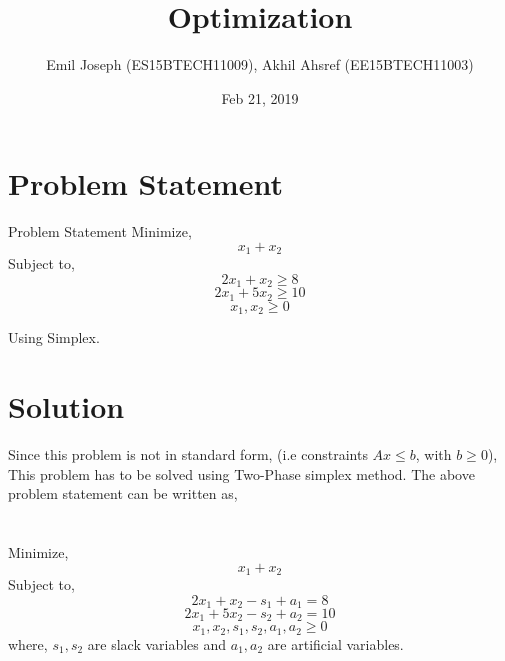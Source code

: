 \documentclass{beamer}
\title[Your Short Title]{Optimization}
\author{Emil Joseph (ES15BTECH11009), Akhil Ahsref (EE15BTECH11003)}
\institute{IITH}
\date{Feb 21, 2019}
\begin{document}
\begin{frame}
  \titlepage
\end{frame}


\section{Problem Statement}

\begin{frame}{Problem Statement}
Minimize, \\
$$x_{1} + x_{2}$$
Subject to,
\begin{equation*}
    2x_{1} + x_{2} \geq 8 
\end{equation*}
\begin{equation*}
    2x_{1} + 5x_{2} \geq 10 
\end{equation*}
\begin{equation*}
    x_{1},x_{2} \geq 0 
\end{equation*}

Using Simplex.

\end{frame}

\section{Solution}
\begin{frame}{}
    Since this problem is not in standard form, (i.e constraints $Ax \leq b$, with $b  \geq 0 $), This problem has to be solved using Two-Phase simplex method. The above problem statement can be written as,\\ \\ \\
    Minimize, \\
$$x_{1} + x_{2}$$
Subject to,
\begin{equation*}
    2x_{1} + x_{2} - s_{1} + a_{1} = 8 
\end{equation*}
\begin{equation*}
    2x_{1} + 5x_{2} - s_{2} + a_{2} = 10 
\end{equation*}
\begin{equation*}
    x_{1},x_{2},s_{1},s_{2},a_{1},a_{2} \geq 0 
\end{equation*}
where, $s_{1}, s_{2}$ are slack variables and $a_{1},a_{2}$ are artificial variables.
\end{frame}
\end{document}
